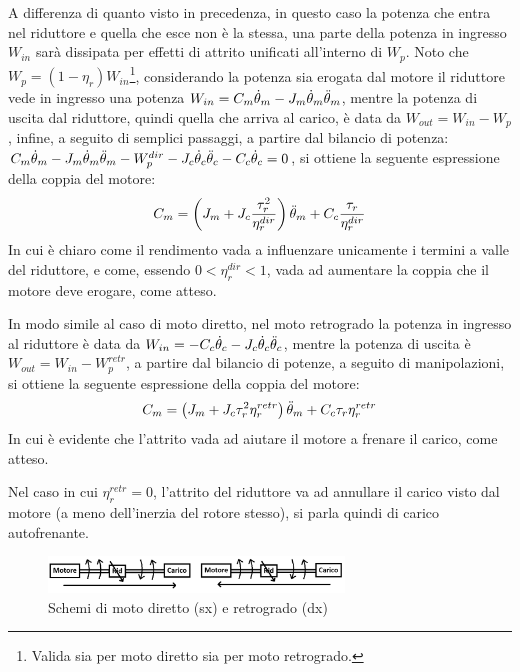 A differenza di quanto visto in precedenza, in questo caso la potenza che entra nel riduttore e quella che esce non è la stessa, una parte della potenza in ingresso $W_{in}$ sarà dissipata per effetti di attrito unificati all'interno di $W_p$. 
Noto che $W_p=(1-\eta_r) W_{in}$\footnote{Valida sia per moto diretto sia per moto retrogrado.}, considerando la potenza sia erogata dal motore il riduttore vede in ingresso una potenza $W_{in}=C_m \dot{\theta}_m - J_m \dot{\theta}_m \Ddot{\theta}_m$, mentre la potenza di uscita dal riduttore, quindi quella che arriva al carico, è data da $W_{out}=W_{in}-W_p$, infine, a seguito di semplici passaggi, a partire dal bilancio di potenza: $C_m \dot{\theta}_m - J_m \dot{\theta}_m \Ddot{\theta}_m - W_p^{dir} - J_c \dot{\theta}_c \Ddot{\theta}_c - C_c \dot{\theta}_c = 0$, si ottiene la seguente espressione della coppia del motore:
\[ C_m = \left(J_m+J_c\frac{\tau^2_r}{\eta_r^{dir}}\right) \Ddot{\theta}_m + C_c\frac{\tau_r}{\eta_r^{dir}} \]
In cui è chiaro come il rendimento vada a influenzare unicamente i termini a valle del riduttore, e come, essendo $0<\eta_r^{dir}<1$, vada ad aumentare la coppia che il motore deve erogare, come atteso.

In modo simile al caso di moto diretto, nel moto retrogrado la potenza in ingresso al riduttore è data da $W_{in}=-C_c\dot{\theta}_c - J_c \dot{\theta}_c \Ddot{\theta}_c$, mentre la potenza di uscita è $W_{out}=W_{in}-W_p^{retr}$, a partire dal bilancio di potenze, a seguito di manipolazioni, si ottiene la seguente espressione della coppia del motore:
\[ C_m = \left(J_m + J_c \tau_r^2\eta_r^{retr} \right)\Ddot{\theta}_m + C_c\tau_r \eta_r^{retr} \]
In cui è evidente che l'attrito vada ad aiutare il motore a frenare il carico, come atteso.

Nel caso in cui $\eta_r^{retr}=0$, l'attrito del riduttore va ad annullare il carico visto dal motore (a meno dell'inerzia del rotore stesso), si parla quindi di carico autofrenante.

\begin{figure}[h]
    \centering
    \includegraphics[width=0.7\textwidth]{Immagini/mrc_moti_diretti_vs_retrogrado.png}
    \caption{Schemi di moto diretto (sx) e retrogrado (dx)}
\end{figure}

